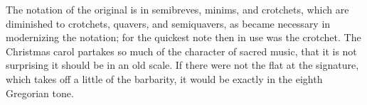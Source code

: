 \renewcommand\rectoheader{christmas carol and wassail song.}

The notation of the original is in semibreves, minims, and crotchets, which
are diminished to crotchets, quavers, and semiquavers, as became necessary in
modernizing the notation; for the quickest note then in use was the crotchet. %
The Christmas carol partakes so much of the character of sacred music, that it is
not surprising it should be in an old scale. If there were not the flat at the signature,
which takes off a little of the barbarity, it would be exactly in the eighth
Gregorian tone.

